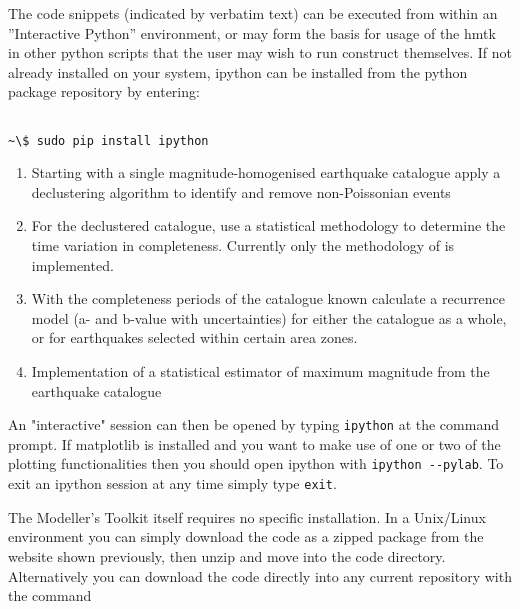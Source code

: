 The code snippets (indicated by verbatim text) can be executed from within an ''Interactive Python'' environment, or may form the basis for usage of the hmtk in other python scripts that the user may wish to run construct themselves. If not already installed on your system, ipython can be installed from the python package repository by entering: 

\begin{Verbatim}[frame=single, commandchars=\\\{\}, fontsize=\scriptsize]

~\$ sudo pip install ipython

\end{Verbatim}


\begin{enumerate}

\item Starting with a single magnitude-homogenised earthquake catalogue apply a declustering algorithm to identify and remove non-Poissonian events

\item For the declustered catalogue, use a statistical methodology to determine the time variation in completeness. Currently only the methodology of \cite{Stepp1971} is implemented.

\item With the completeness periods of the catalogue known calculate a \cite{GutenbergRichter1944} recurrence model (a- and b-value with uncertainties) for either the catalogue as a whole, or for earthquakes selected within certain area zones.

\item Implementation of a statistical estimator of maximum magnitude from the earthquake catalogue  

\end{enumerate}

An "interactive" session can then be opened by typing \verb=ipython= at the command prompt. If matplotlib is installed and you want to make use of one or two of the plotting functionalities then you should open ipython with \verb=ipython --pylab=. To exit an ipython session at any time simply type \verb=exit=.

The Modeller's Toolkit itself requires no specific installation. In a Unix/Linux environment you can simply download the code as a zipped package from the website shown previously, then unzip and move into the code directory.
Alternatively you can download the code directly into  any current repository with the command

